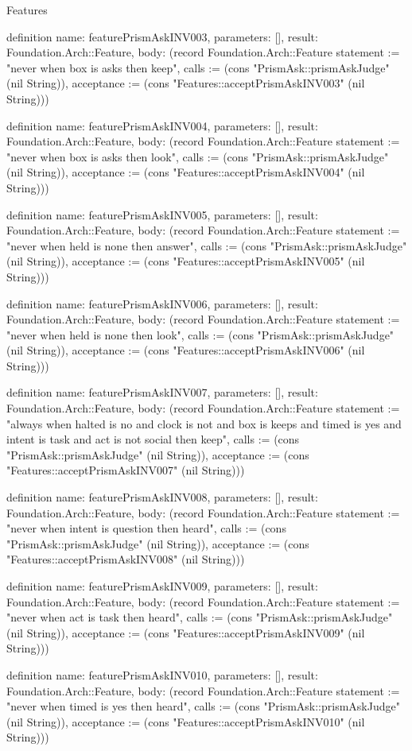 \begin{lexlean}{Features}
\begin{semanticmodule}
definition{
  name: featurePrismAskINV003,
  parameters: [],
  result: Foundation.Arch::Feature,
  body: (record Foundation.Arch::Feature {statement := "never when box is asks then keep", calls := (cons "PrismAsk::prismAskJudge" (nil String)), acceptance := (cons "Features::acceptPrismAskINV003" (nil String))})
}

definition{
  name: featurePrismAskINV004,
  parameters: [],
  result: Foundation.Arch::Feature,
  body: (record Foundation.Arch::Feature {statement := "never when box is asks then look", calls := (cons "PrismAsk::prismAskJudge" (nil String)), acceptance := (cons "Features::acceptPrismAskINV004" (nil String))})
}

definition{
  name: featurePrismAskINV005,
  parameters: [],
  result: Foundation.Arch::Feature,
  body: (record Foundation.Arch::Feature {statement := "never when held is none then answer", calls := (cons "PrismAsk::prismAskJudge" (nil String)), acceptance := (cons "Features::acceptPrismAskINV005" (nil String))})
}

definition{
  name: featurePrismAskINV006,
  parameters: [],
  result: Foundation.Arch::Feature,
  body: (record Foundation.Arch::Feature {statement := "never when held is none then look", calls := (cons "PrismAsk::prismAskJudge" (nil String)), acceptance := (cons "Features::acceptPrismAskINV006" (nil String))})
}

definition{
  name: featurePrismAskINV007,
  parameters: [],
  result: Foundation.Arch::Feature,
  body: (record Foundation.Arch::Feature {statement := "always when halted is no and clock is not and box is keeps and timed is yes and intent is task and act is not social then keep", calls := (cons "PrismAsk::prismAskJudge" (nil String)), acceptance := (cons "Features::acceptPrismAskINV007" (nil String))})
}

definition{
  name: featurePrismAskINV008,
  parameters: [],
  result: Foundation.Arch::Feature,
  body: (record Foundation.Arch::Feature {statement := "never when intent is question then heard", calls := (cons "PrismAsk::prismAskJudge" (nil String)), acceptance := (cons "Features::acceptPrismAskINV008" (nil String))})
}

definition{
  name: featurePrismAskINV009,
  parameters: [],
  result: Foundation.Arch::Feature,
  body: (record Foundation.Arch::Feature {statement := "never when act is task then heard", calls := (cons "PrismAsk::prismAskJudge" (nil String)), acceptance := (cons "Features::acceptPrismAskINV009" (nil String))})
}

definition{
  name: featurePrismAskINV010,
  parameters: [],
  result: Foundation.Arch::Feature,
  body: (record Foundation.Arch::Feature {statement := "never when timed is yes then heard", calls := (cons "PrismAsk::prismAskJudge" (nil String)), acceptance := (cons "Features::acceptPrismAskINV010" (nil String))})
}


\end{semanticmodule}
\end{lexlean}

